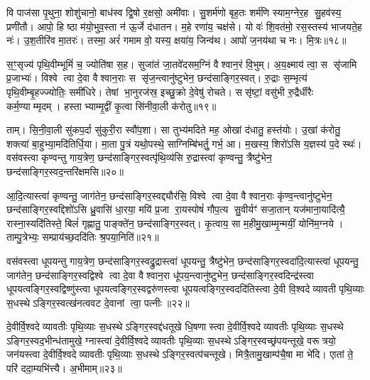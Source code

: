 {\anuvakamend[{सु॒श॒स्तिभि॑श्शि॒वो भ॑व याहि॒ षट्त्रिꣳ॑शच्च॥४॥}]}

वि पाज॑सा पृ॒थुना॒ शोशु॑चानो॒ बाध॑स्व द्वि॒षो र॒क्षसो॒ अमी॑वाः। सु॒शर्म॑णो बृह॒तः शर्म॑णि स्याम॒ग्नेर॒ह सु॒हव॑स्य॒ प्रणी॑तौ। आपो॒ हि ष्ठा म॑यो॒भुव॒स्ता न॑ ऊ॒र्जे द॑धातन। म॒हे रणा॑य॒ चक्ष॑से। यो वः॑ शि॒वत॑मो॒ रस॒स्तस्य॑ भाजयते॒ह नः॑। उ॒श॒तीरि॑व मा॒तरः॑। तस्मा॒ अरं॑ गमाम वो॒ यस्य॒ क्षया॑य॒ जिन्व॑थ। आपो॑ ज॒नय॑था च नः। मि॒त्रः॥१८॥

स॒ꣳ॒सृज्य॑ पृथि॒वीम्भूमिं॑ च॒ ज्योति॑षा स॒ह। सुजा॑तं जा॒तवे॑दसम॒ग्निं वैश्वान॒रं वि॒भुम्। अ॒य॒क्ष्माय॑ त्वा॒ स सृ॑जामि प्र॒जाभ्यः॑। विश्वे त्वा दे॒वा वैश्वान॒राः स सृ॑ज॒न्त्वानु॑ष्टुभेन॒ छन्द॑साङ्गिर॒स्वत्। रु॒द्राः स॒म्भृत्य॑ पृथि॒वीम्बृ॒हज्ज्योतिः॒ समी॑धिरे। तेषां भा॒नुरज॑स्र॒ इच्छु॒क्रो दे॒वेषु॑ रोचते। ससृ॑ष्टां॒ वसु॑भी रु॒द्रैर्धीरैः कर्म॒ण्याम्मृदम्। हस्ताभ्याम्मृ॒द्वीं कृ॒त्वा सि॑नीवा॒ली क॑रोतु॥१९॥

ताम्। सि॒नी॒वा॒ली सु॑कप॒र्दा सु॑कुरी॒रा स्वौ॑प॒शा। सा तुभ्य॑मदिते मह॒ ओखां द॑धातु॒ हस्त॑योः। उ॒खां क॑रोतु॒ शक्त्या॑ बा॒हुभ्या॒मदि॑तिर्धि॒या। मा॒ता पु॒त्रं यथो॒पस्थे॒ साग्निम्बि॑भर्तु॒ गर्भ॒ आ। म॒खस्य॒ शिरो॑ऽसि य॒ज्ञस्य॑ प॒दे स्थः॑। वस॑वस्त्वा कृण्वन्तु गाय॒त्रेण॒ छन्द॑साङ्गिर॒स्वत्पृ॑थि॒व्य॑सि रु॒द्रास्त्वा॑ कृण्वन्तु॒ त्रैष्टु॑भेन॒ छन्द॑साङ्गिर॒स्वद॒न्तरि॑क्षमसि॥२०॥

आ॒दि॒त्यास्त्वा॑ कृण्वन्तु॒ जाग॑तेन॒ छन्द॑साङ्गिर॒स्वद्द्यौर॑सि॒ विश्वे त्वा दे॒वा वैश्वान॒राः कृ॑ण्व॒न्त्वानु॑ष्टुभेन॒ छन्द॑साङ्गिर॒स्वद्दिशो॑ऽसि ध्रु॒वासि॑ धा॒रया॒ मयि॑ प्र॒जा रा॒यस्पोषं॑ गौप॒त्य सु॒वीर्यꣳ॑ सजा॒तान् यज॑माना॒यादि॑त्यै॒ रास्ना॒स्यदि॑तिस्ते॒ बिलं॑ गृह्णातु॒ पाङ्क्ते॑न॒ छन्द॑साङ्गिर॒स्वत्। कृ॒त्वाय॒ सा म॒हीमु॒खाम्मृ॒न्मयीं॒ योनि॑म॒ग्नये। ताम्पु॒त्रेभ्यः॒ सम्प्राय॑च्छ॒ददि॑तिः श्र॒पया॒निति॑॥२१॥

{\anuvakamend[{मि॒त्रः क॑रोत्व॒न्तरि॑ख्षमसि॒ प्र च॒त्वारि॑ च॥५॥}]}

वस॑वस्त्वा धूपयन्तु गाय॒त्रेण॒ छन्द॑साङ्गिर॒स्वद्रु॒द्रास्त्वा॑ धूपयन्तु॒ त्रैष्टु॑भेन॒ छन्द॑साङ्गिर॒स्वदा॑दि॒त्यास्त्वा॑ धूपयन्तु॒ जाग॑तेन॒ छन्द॑साङ्गिर॒स्वद्विश्वे त्वा दे॒वा वैश्वान॒रा धू॑पय॒न्त्वानु॑ष्टुभेन॒ छन्द॑साङ्गिर॒स्वदिन्द्र॑स्त्वा धूपयत्वङ्गिर॒स्वद्विष्णु॑स्त्वा धूपयत्वङ्गिर॒स्वद्वरु॑णस्त्वा धूपयत्वङ्गिर॒स्वददि॑तिस्त्वा दे॒वी वि॒श्वदेव्यावती पृथि॒व्याः स॒धस्थेऽङ्गिर॒स्वत्ख॑नत्ववट दे॒वानां त्वा॒ पत्नीः॥२२॥

दे॒वीर्वि॒श्वदेव्यावतीः पृथि॒व्याः स॒धस्थेऽङ्गिर॒स्वद्द॑धतूखे धि॒षणास्त्वा दे॒वीर्वि॒श्वदेव्यावतीः पृथि॒व्याः स॒धस्थे ऽङ्गिर॒स्वद॒भीन्ध॑तामुखे॒ ग्नास्त्वा॑ दे॒वीर्वि॒श्वदेव्यावतीः पृथि॒व्याः स॒धस्थेऽङ्गिर॒स्वच्छ्र॑पयन्तूखे॒ वरूत्रयो॒ जन॑यस्त्वा दे॒वीर्वि॒श्वदेव्यावतीः पृथि॒व्याः स॒धस्थेऽङ्गिर॒स्वत्प॑चन्तूखे। मित्रै॒तामु॒खाम्प॑चै॒षा मा भे॑दि। एातां ते॒ परि॑ ददा॒म्यभि॑त्त्यै। अ॒भीमाम्॥२३॥

